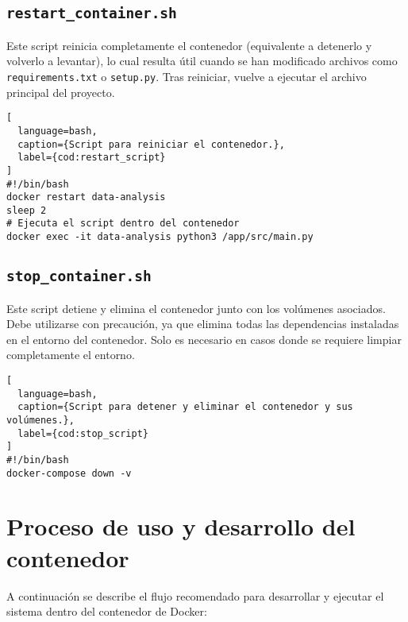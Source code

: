 \subsection{\texttt{restart\_container.sh}}

Este script reinicia completamente el contenedor (equivalente a detenerlo y volverlo a levantar), lo cual resulta útil cuando se han modificado archivos como \texttt{requirements.txt} o \texttt{setup.py}. Tras reiniciar, vuelve a ejecutar el archivo principal del proyecto.

\begin{lstlisting}[
  language=bash,
  caption={Script para reiniciar el contenedor.},
  label={cod:restart_script}
]
#!/bin/bash
docker restart data-analysis
sleep 2
# Ejecuta el script dentro del contenedor
docker exec -it data-analysis python3 /app/src/main.py
\end{lstlisting}

\subsection{\texttt{stop\_container.sh}}

Este script detiene y elimina el contenedor junto con los volúmenes asociados. Debe utilizarse con precaución, ya que elimina todas las dependencias instaladas en el entorno del contenedor. Solo es necesario en casos donde se requiere limpiar completamente el entorno.

\begin{lstlisting}[
  language=bash,
  caption={Script para detener y eliminar el contenedor y sus volúmenes.},
  label={cod:stop_script}
]
#!/bin/bash
docker-compose down -v
\end{lstlisting}

\section{Proceso de uso y desarrollo del contenedor}

A continuación se describe el flujo recomendado para desarrollar y ejecutar el sistema dentro del contenedor de Docker:

